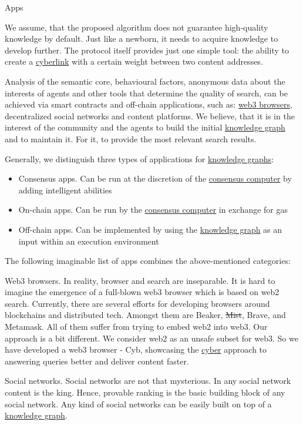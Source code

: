 \documentclass[8pt,oneside]{amsart}
\makeatletter
\renewcommand\subsection{\@startsection{subsection}
                                    {2}{\z@}
                                    {-3.25ex\@plus -1ex \@minus -.2ex}
                                    {0ex \@plus .2ex}
                                    {\play\Large}
                        }
\newcommand{\titleSection}[1]{\subsection{#1}}
\makeatother
\begin{document}
\titleSection{Apps}\label{apps}

We assume, that the proposed algorithm does not guarantee high-quality knowledge by default. Just like a newborn, it needs to acquire knowledge to develop further. The protocol itself provides just one simple tool: the ability to create a {\hyperref[cyberlinks]{cyberlink}} with a certain weight between two content addresses.

Analysis of the semantic core, behavioural factors, anonymous data about the interests of agents and other tools that determine the quality of search, can be achieved via smart contracts and off-chain applications, such as: {\hyperref[browzers]{web3 browsers}}, decentralized social networks and content platforms. We believe, that it is in the interest of the community and the agents to build the initial {\hyperref[knowledge-graph]{knowledge graph}} and to maintain it. For it, to provide the most relevant search results.

Generally, we distinguish three types of applications for {\hyperref[knowledge-graph]{knowledge graphs}}:

\begin{itemize}
\item Consensus apps. Can be run at the discretion of the {\hyperref[consensus-computer]{consensus computer}} by adding intelligent abilities
\item On-chain apps. Can be run by the {\hyperref[consensus-computer]{consensus computer}} in exchange for gas
\item Off-chain apps. Can be implemented by using the {\hyperref[knowledge-graph]{knowledge graph}} as an input within an execution environment
\end{itemize}

The following imaginable list of apps combines the above-mentioned categories:

Web3 browsers. In reality, browser and search are inseparable. It is hard to imagine the emergence of a full-blown web3 browser which is based on web2 search. Currently, there are several efforts for developing browsers around blockchains and distributed tech. Amongst them are Beaker, \sout{Mist}, Brave, and Metamask. All of them suffer from trying to embed web2 into web3. Our approach is a bit different. We consider web2 as an unsafe subset for web3. So we have developed a web3 browser - Cyb, showcasing the {\hyperref[cyber]{cyber}} approach to answering queries better and deliver content faster.

Social networks. Social networks are not that mysterious. In any social network content is the king. Hence, provable ranking is the basic building block of any social network. Any kind of social networks can be easily built on top of a {\hyperref[knowledge-graph]{knowledge graph}}.
\end{document}
